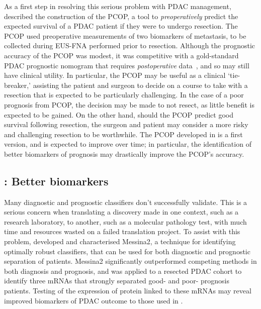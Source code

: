 \documentclass[thesis.tex]{subfiles}
\begin{document}
As a first step in resolving this serious problem with \gls{PDAC} management,  described the construction of the \gls{PCOP}, a tool to \emph{preoperatively} predict the expected survival of a \gls{PDAC} patient if they were to undergo resection.  The \gls{PCOP} used preoperative measurements of two biomarkers of metastasis, to be collected during \gls{EUS}-\gls{FNA} performed prior to resection.  Although the prognostic accuracy of the \gls{PCOP} was modest, it was competitive with a gold-standard \gls{PDAC} prognostic nomogram that requires \emph{postoperative} data~\cite{Brennan2004}, and so may still have clinical utility.  In particular, the \gls{PCOP} may be useful as a clinical `tie-breaker,' assisting the patient and surgeon to decide on a course to take with a resection that is expected to be particularly challenging.  In the case of a poor prognosis from \gls{PCOP}, the decision may be made to not resect, as little benefit is expected to be gained.  On the other hand, should the \gls{PCOP} predict good survival following resection, the surgeon and patient may consider a more risky and challenging resection to be worthwhile.  The \gls{PCOP} developed in  is a first version, and is expected to improve over time; in particular, the identification of better biomarkers of prognosis may drastically improve the \gls{PCOP}'s accuracy.
  
\subsection{\texorpdfstring{}{Chapter 4}: Better biomarkers}
Many diagnostic and prognostic classifiers don't successfully validate.  This is a serious concern when translating a discovery made in one context, such as a research laboratory, to another, such as a molecular pathology test, with much time and resources wasted on a failed translation project.  To assist with this problem,  developed and characterised Messina2, a technique for identifying optimally robust classifiers, that can be used for both diagnostic and prognostic separation of patients.  Messina2 significantly outperformed competing methods in both diagnosis and prognosis, and was applied to a resected \gls{PDAC} cohort to identify three mRNAs that strongly separated good- and poor- prognosis patients.  Testing of the expression of protein linked to these mRNAs may reveal improved biomarkers of \gls{PDAC} outcome to those used in .
\end{document}
